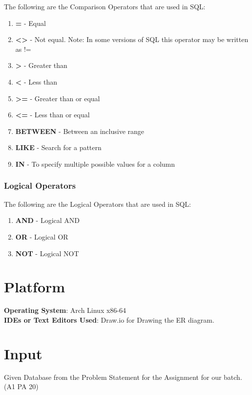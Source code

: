 \documentclass[11pt]{article}
\begin{document}
The following are the Comparison Operators that are used in SQL:

\begin{enumerate}
	\item \textbf{=} - Equal
	\item \textbf{<>} - Not equal. Note: In some versions of SQL this operator may be written as !=
	\item \textbf{>} - Greater than
	\item \textbf{<} - Less than
	\item \textbf{>=} - Greater than or equal
	\item \textbf{<=} - Less than or equal
	\item \textbf{BETWEEN} - Between an inclusive range
	\item \textbf{LIKE} - Search for a pattern
	\item \textbf{IN} - To specify multiple possible values for a column
\end{enumerate}

\subsubsection{Logical Operators}

The following are the Logical Operators that are used in SQL:

\begin{enumerate}
	\item \textbf{AND} - Logical AND
	\item \textbf{OR} - Logical OR
	\item \textbf{NOT} - Logical NOT
\end{enumerate}


\section{Platform}
\textbf{Operating System}: Arch Linux x86-64 \\
\textbf{IDEs or Text Editors Used}: Draw.io for Drawing the ER diagram.


\section{Input}
Given Database from the Problem Statement for the Assignment for our batch. (A1 PA 20)
\end{document}
